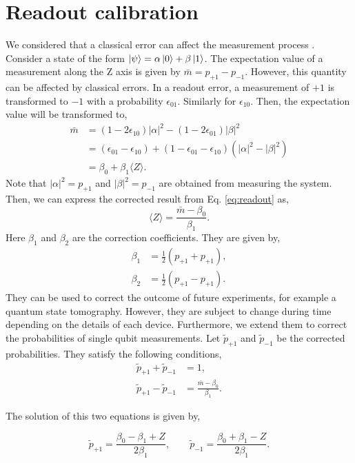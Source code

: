 \section{Readout calibration}
We considered that a classical error can affect the measurement process \cite{LeoDiCarloNotes}. Consider a state of the form $\ket{\psi} = \alpha\ket{0}+\beta\ket{1}$. The expectation value of a measurement along the Z axis is given by $\bar{m}=p_{+1}-p_{-1}$. However, this quantity can be affected by classical errors. 
In a readout error, a measurement of $+1$ is transformed to $-1$ with a probability $\epsilon_{01}$. Similarly for $\epsilon_{10}$. Then, the expectation value will be transformed to,
\begin{align}\label{eq:readout}
\bar{m} &= (1-2\epsilon_{10})|\alpha|^2-(1-2\epsilon_{01})|\beta|^2\\
&=(\epsilon_{01}-\epsilon_{10})+(1-\epsilon_{01}-\epsilon_{10})(|\alpha|^2-|\beta|^2)\\
&= \beta_0 + \beta_1 \langle Z\rangle.
\end{align}
Note that $|\alpha|^2=p_{+1}$ and $|\beta|^2=p_{-1}$ are obtained from measuring the system. Then, we can express the corrected result from Eq. \eqref{eq:readout} as,
\begin{equation}
\langle Z\rangle = \frac{\bar{m}-\beta_0}{\beta_1}.
\end{equation}
Here $\beta_1$ and $\beta_2$ are the correction coefficients. They are given by,
\begin{align}\label{eq:betas}
\beta_1 &= \frac{1}{2} (p_{+1}+p_{+1}),\\
\beta_2 &= \frac{1}{2} (p_{+1}-p_{+1}).
\end{align}
They can be used to correct the outcome of future experiments, for example a quantum state tomography. However, they are subject to change during time depending on the details of each device. Furthermore, we extend them to correct the probabilities of single qubit measurements. Let $\tilde{p}_{+1}$ and $\tilde{p}_{-1}$ be the corrected probabilities. They satisfy the following conditions,
\begin{align}
\tilde{p}_{+1}+\tilde{p}_{-1} &= 1,\\
\tilde{p}_{+1}-\tilde{p}_{-1} & = \frac{\bar{m}-\beta_0}{\beta_1}.
\end{align}

The solution of this two equations is given by,

\begin{equation}\label{eq:corrected_ps}
\tilde{p}_{+1} = \frac{\beta_0 - \beta_1 +Z}{2\beta_1},\qquad \tilde{p}_{-1} = \frac{\beta_0 + \beta_1 -Z}{2\beta_1}.
\end{equation}

